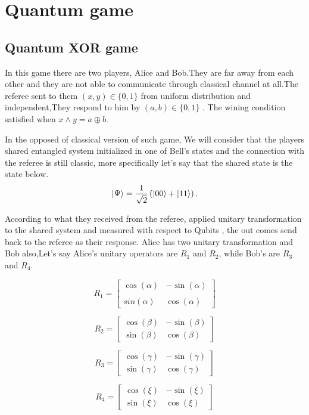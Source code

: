 \chapter{Quantum game}
\section{Quantum XOR game}
In this game there are  two players, Alice and Bob.They are far away from each other and they are not able to communicate through classical channel at all.The referee sent to them    $(x,y)\in \{0,1\}$  from uniform distribution and independent\citep{PhysRevA.93.022333},They respond  to him by $(a,b)\in \{0,1\}$ .  The   wining  condition  satisfied when $x\wedge y= a\oplus b$.

In the opposed of classical version of such game, We will consider that the players shared entangled system initialized in one of Bell's states and the connection with the referee is still classic, more specifically let's say that the shared state is the state below.
\begin{equation}
\ket{\Psi }= \frac{1}{\sqrt{2}}\left( \ket{00} +\ket{11} \right)\label{eq1} .
\end{equation}
	  
	  
According to what they received from the referee, applied unitary transformation to the shared system  and measured with respect to  Qubits , the out comes send back to the referee as their response. Alice has two unitary transformation and Bob also,Let's say Alice's unitary operators  are $R_1$ and $R_2$, while Bob's are $R_3$ and $R_4$.
	 
$$	R_1= \begin{bmatrix}
\cos(\alpha) & -\sin(\alpha)\\
\\sin(\alpha) &  \cos(\alpha)
\end{bmatrix}$$	

	
 $$	R_2= \begin{bmatrix}
 \cos(\beta)  &  -\sin(\beta) \\
  \sin(\beta) &  \cos(\beta)
 \end{bmatrix}
 $$
 	

 
 $$
 R_3= \begin{bmatrix}
 \cos(\gamma)  &  -\sin(\gamma) \\
 \sin(\gamma)  &  \cos(\gamma)
 \end{bmatrix}
 $$	

$$
R_4= \begin{bmatrix}
\cos(\xi)  &  -\sin(\xi) \\
\sin(\xi) &  \cos(\xi)
\end{bmatrix}
$$

